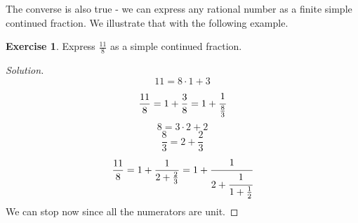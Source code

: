 \documentclass[12pt,letterpaper]{book}
\theoremstyle{definition}
\newtheorem*{exercise}{Exercise}
\newenvironment{solution}
  {\renewcommand\qedsymbol{$\blacksquare$}\begin{proof}[Solution]}
  {\end{proof}}
\begin{document}
The converse is also true - we can express any rational number as a finite simple continued fraction. We illustrate that with the following example.

\begin{exercise}
  Express $\frac{11}{8}$ as a simple continued fraction.
\end{exercise}
\begin{solution}
  \[11 = 8 \cdot 1 + 3\] 
  \[\frac{11}{8} = 1 + \frac{3}{8} = 1 + \cfrac{1}{\frac{8}{3}}\]
  \[8 = 3 \cdot 2 + 2\]
  \[\frac{8}{3} = 2 + \frac{2}{3}\]
  \[\frac{11}{8} = 1 + \frac{1}{2 + \frac{2}{3}} = 1 + \cfrac{1}{2 + \cfrac{1}{1 + \frac{1}{2}}}\]
  We can stop now since all the numerators are unit.
\end{solution}
\end{document}

